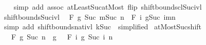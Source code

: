 \begin{isabellebody}
%
\isadelimproof
\ \ %
\endisadelimproof
%
\isatagproof
{}\isamarkupfalse%
\ {\isacharparenleft}{\kern0pt}simp\ add{\isacharcolon}{\kern0pt}\ assoc\ atLeast{\isacharunderscore}{\kern0pt}Suc{\isacharunderscore}{\kern0pt}atMost\ flip{\isacharcolon}{\kern0pt}\ shift{\isacharunderscore}{\kern0pt}bounds{\isacharunderscore}{\kern0pt}cl{\isacharunderscore}{\kern0pt}Suc{\isacharunderscore}{\kern0pt}ivl{\isacharparenright}{\kern0pt}%
\endisatagproof
{\isafoldproof}%
%
\isadelimproof
\isanewline
%
\endisadelimproof
\isanewline
{}\isamarkupfalse%
\ shift{\isacharunderscore}{\kern0pt}bounds{\isacharunderscore}{\kern0pt}Suc{\isacharunderscore}{\kern0pt}ivl{\isacharcolon}{\kern0pt}\isanewline
\ \ {\isachardoublequoteopen}F\ g\ {\isacharbraceleft}{\kern0pt}Suc\ m{\isachardot}{\kern0pt}{\isachardot}{\kern0pt}{\isacharless}{\kern0pt}Suc\ n{\isacharbraceright}{\kern0pt}\ {\isacharequal}{\kern0pt}\ F\ {\isacharparenleft}{\kern0pt}{\isasymlambda}i{\isachardot}{\kern0pt}\ g{\isacharparenleft}{\kern0pt}Suc\ i{\isacharparenright}{\kern0pt}{\isacharparenright}{\kern0pt}{\isacharbraceleft}{\kern0pt}m{\isachardot}{\kern0pt}{\isachardot}{\kern0pt}{\isacharless}{\kern0pt}n{\isacharbraceright}{\kern0pt}{\isachardoublequoteclose}\isanewline
%
\isadelimproof
%
\endisadelimproof
%
\isatagproof
{}\isamarkupfalse%
\ {\isacharparenleft}{\kern0pt}simp\ add{\isacharcolon}{\kern0pt}\ shift{\isacharunderscore}{\kern0pt}bounds{\isacharunderscore}{\kern0pt}nat{\isacharunderscore}{\kern0pt}ivl{\isacharbrackleft}{\kern0pt}\ k{\isacharequal}{\kern0pt}{\isachardoublequoteopen}Suc\ {}{\isachardoublequoteclose}{\isacharcomma}{\kern0pt}\ simplified{\isacharbrackright}{\kern0pt}{\isacharparenright}{\kern0pt}%
\endisatagproof
{\isafoldproof}%
%
\isadelimproof
\isanewline
%
\endisadelimproof
\isanewline
{}\isamarkupfalse%
\ atMost{\isacharunderscore}{\kern0pt}Suc{\isacharunderscore}{\kern0pt}shift{\isacharcolon}{\kern0pt}\isanewline
\ \ \ {\isachardoublequoteopen}F\ g\ {\isacharbraceleft}{\kern0pt}{\isachardot}{\kern0pt}{\isachardot}{\kern0pt}Suc\ n{\isacharbraceright}{\kern0pt}\ {\isacharequal}{\kern0pt}\ g\ {}\ \isactrlbold {\isacharasterisk}{\kern0pt}\ F\ {\isacharparenleft}{\kern0pt}{\isasymlambda}i{\isachardot}{\kern0pt}\ g\ {\isacharparenleft}{\kern0pt}Suc\ i{\isacharparenright}{\kern0pt}{\isacharparenright}{\kern0pt}\ {\isacharbraceleft}{\kern0pt}{\isachardot}{\kern0pt}{\isachardot}{\kern0pt}n{\isacharbraceright}{\kern0pt}{\isachardoublequoteclose}\isanewline
%
\isadelimproof
%

\end{isabellebody}
